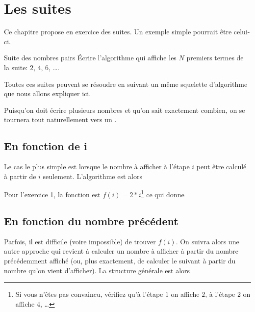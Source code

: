 \chapter{Les suites}

Ce chapitre propose en exercice des suites.
Un exemple simple pourrait être celui-ci.

\begin{Exercice}{Suite des nombres pairs}
	Écrire l'algorithme qui affiche les $N$ premiers termes
	de la suite: $2$, $4$, $6$, \dots.
\end{Exercice}

Toutes ces suites peuvent se résoudre 
en suivant un même squelette d'algorithme que nous allons expliquer ici.

Puisqu'on doit écrire plusieurs nombres et qu'on sait exactement combien,
on se tournera tout naturellement vers un .

\section*{En fonction de i}

Le cas le plus simple est lorsque le nombre à afficher à l'étape $i$
peut être calculé à partir de $i$ seulement.
L'algorithme est alors


Pour l'exercice 1, la fonction est $f(i)=2*i$\footnote{Si vous
n'êtes pas convaincu, vérifiez qu'à l'étape $1$ on affiche $2$,
à l'étape $2$ on affiche $4$, \dots} ce qui donne


\section*{En fonction du nombre précédent}

Parfois, il est difficile (voire impossible) de trouver $f(i)$.
On suivra alors une autre approche qui revient à calculer un nombre
à afficher à partir du nombre précédemment affiché
(ou, plus exactement, de calculer le suivant à partir du nombre
qu'on vient d'afficher).
La structure générale est alors

